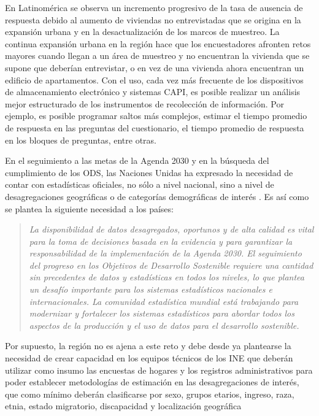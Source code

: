 \documentclass[12pt,spanish,]{book}
\begin{document}
En Latinomérica se observa un incremento progresivo de la tasa de ausencia de respuesta debido al aumento de viviendas no entrevistadas que se origina en la expansión urbana y en la desactualización de los marcos de muestreo. La continua expansión urbana en la región hace que los encuestadores afronten retos mayores cuando llegan a un área de muestreo y no encuentran la vivienda que se supone que deberían entrevistar, o en vez de una vivienda ahora encuentran un edificio de apartamentos. Con el uso, cada vez más frecuente de los dispositivos de almacenamiento electrónico y sistemas CAPI, es posible realizar un análisis mejor estructurado de los instrumentos de recolección de información. Por ejemplo, es posible programar saltos más complejos, estimar el tiempo promedio de respuesta en las preguntas del cuestionario, el tiempo promedio de respuesta en los bloques de preguntas, entre otras.

En el seguimiento a las metas de la Agenda 2030 y en la búsqueda del cumplimiento de los ODS, las Naciones Unidas ha expresado la necesidad de contar con estadísticas oficiales, no sólo a nivel nacional, sino a nivel de desagregaciones geográficas o de categorías demográficas de interés \autocite{United_Nations_2017}. Es así como se plantea la siguiente necesidad a los países:

\begin{quote}
\emph{La disponibilidad de datos desagregados, oportunos y de alta calidad es vital para la toma de decisiones basada en la evidencia y para garantizar la responsabilidad de la implementación de la Agenda 2030. El seguimiento del progreso en los Objetivos de Desarrollo Sostenible requiere una cantidad sin precedentes de datos y estadísticas en todos los niveles, lo que plantea un desafío importante para los sistemas estadísticos nacionales e internacionales. La comunidad estadística mundial está trabajando para modernizar y fortalecer los sistemas estadísticos para abordar todos los aspectos de la producción y el uso de datos para el desarrollo sostenible.}
\end{quote}

Por supuesto, la región no es ajena a este reto y debe desde ya plantearse la necesidad de crear capacidad en los equipos técnicos de los INE que deberán utilizar como insumo las encuestas de hogares y los registros administrativos para poder establecer metodologías de estimación en las desagregaciones de interés, que como mínimo deberán clasificarse por sexo, grupos etarios, ingreso, raza, etnia, estado migratorio, discapacidad y localización geográfica \autocite{United_Nations_2016}
\end{document}
